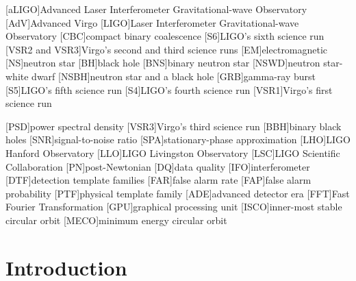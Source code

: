 \newcommand\abs[1]{\ensuremath{\left|#1\right|}}

\def\be{\begin{equation}}
\def\ee{\end{equation}}

\def\bea{\begin{eqnarray}}
\def\eea{\end{eqnarray}}

\def\Msun{M_\odot}

\def\cross{\times}





[aLIGO]{Advanced Laser Interferometer Gravitational-wave Observatory}
[AdV]{Advanced Virgo}
[LIGO]{Laser Interferometer Gravitational-wave Observatory}
[CBC]{compact binary coalescence}
[S6]{LIGO's sixth science run}
[VSR2 and VSR3]{Virgo's second and third science runs}
[EM]{electromagnetic}
[NS]{neutron star}
[BH]{black hole}
[BNS]{binary neutron star}
[NSWD]{neutron star-white dwarf}
[NSBH]{neutron star and a black hole}
[GRB]{gamma-ray burst}
[S5]{LIGO's fifth science run}
[S4]{LIGO's fourth science run}
[VSR1]{Virgo's first science run}

[PSD]{power spectral density}
[VSR3]{Virgo's third science run}
[BBH]{binary black holes}
[SNR]{signal-to-noise ratio}
[SPA]{stationary-phase approximation}
[LHO]{LIGO Hanford Observatory}
[LLO]{LIGO Livingston Observatory}
[LSC]{LIGO Scientific Collaboration}
[PN]{post-Newtonian}
[DQ]{data quality}
[IFO]{interferometer}
[DTF]{detection template families}
[FAR]{false alarm rate}
[FAP]{false alarm probability}
[PTF]{physical template family}
[ADE]{advanced detector era}
[FFT]{Fast Fourier Transformation}
[GPU]{graphical processing unit}
[ISCO]{inner-most stable circular orbit}
[MECO]{minimum energy circular orbit}

\section{Introduction}
\label{sec:introduction}

